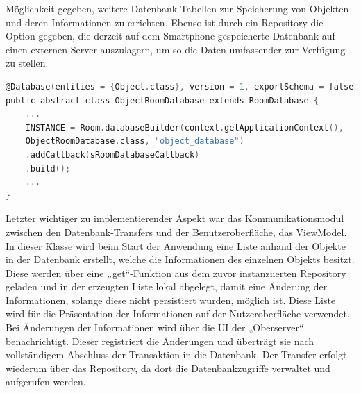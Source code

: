 Möglichkeit gegeben, weitere Datenbank-Tabellen zur Speicherung von Objekten und deren Informationen zu errichten. Ebenso ist durch ein Repository die Option 
gegeben, die derzeit auf dem Smartphone gespeicherte Datenbank auf einen externen Server auszulagern, um so die Daten umfassender %
zur Verfügung zu stellen. 
\\ 
\begin{lstlisting}[language=C,
    frame=lines,           % Ein Rahmen um den Code (single for box, lines for top and bottom)
    xleftmargin=\parindent,  % Rahmen link von den Zahlen
    style=algoBericht,
    label={code:dblayer},
    captionpos=b,           % Caption unter den Code setzen
caption={Erzeugung des Datenbank-Layers „Room“}]
@Database(entities = {Object.class}, version = 1, exportSchema = false)
public abstract class ObjectRoomDatabase extends RoomDatabase {
    ...
    INSTANCE = Room.databaseBuilder(context.getApplicationContext(),
    ObjectRoomDatabase.class, "object_database")
    .addCallback(sRoomDatabaseCallback)
    .build();
    ...
}
\end{lstlisting}
Letzter wichtiger zu implementierender Aspekt war das Kommunikationsmodul zwischen den Datenbank-Transfers und der Benutzeroberfläche, das ViewModel. 
In dieser Klasse wird beim Start der Anwendung eine Liste anhand der Objekte in der Datenbank erstellt, welche die Informationen des einzelnen Objekts besitzt. 
Diese werden über eine „get“-Funktion aus dem zuvor instanziierten Repository geladen und in der erzeugten Liste lokal abgelegt, damit eine Änderung der 
Informationen, solange diese nicht persistiert wurden, möglich ist. Diese Liste wird für 
die Präsentation der Informationen auf der Nutzeroberfläche verwendet. Bei Änderungen der Informationen wird über die \acs{UI} der „Oberserver“ benachrichtigt. 
Dieser registriert die Änderungen und überträgt sie nach vollständigem Abschluss der Transaktion in die Datenbank. Der Transfer erfolgt wiederum über das 
Repository, da dort die Datenbankzugriffe verwaltet und aufgerufen werden. %
